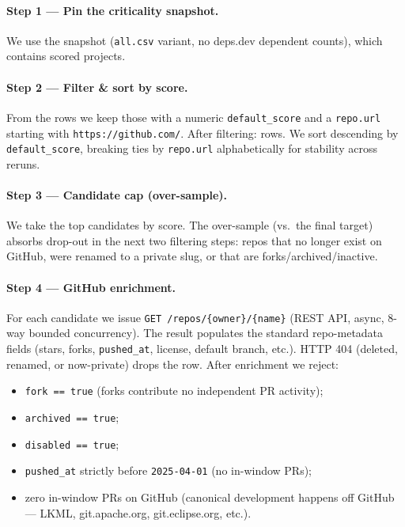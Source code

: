 \paragraph{Step 1 --- Pin the criticality snapshot.} We use the
\PLACEHOLDERSNAPSHOT{} snapshot (\texttt{all.csv} variant, no deps.dev
dependent counts), which contains \PLACEHOLDERSNAPSHOTROWS{} scored
projects.

\paragraph{Step 2 --- Filter \& sort by score.} From the
\PLACEHOLDERSNAPSHOTROWS{} rows we keep those with a numeric
\texttt{default\_score} and a \texttt{repo.url} starting with
\texttt{https://github.com/}. After filtering: \PLACEHOLDERSCOREDROWS{}
rows. We sort descending by \texttt{default\_score}, breaking ties by
\texttt{repo.url} alphabetically for stability across reruns.

\paragraph{Step 3 --- Candidate cap (over-sample).} We take the top
\PLACEHOLDERCANDCAP{} candidates by score. The over-sample (vs.\ the
final \PLACEHOLDERFINALCAP{} target) absorbs drop-out in the next two
filtering steps: repos that no longer exist on GitHub, were renamed to a
private slug, or that are forks/archived/inactive.

\paragraph{Step 4 --- GitHub enrichment.} For each candidate we issue
\texttt{GET /repos/\{owner\}/\{name\}} (REST API, async, 8-way bounded
concurrency). The result populates the standard repo-metadata fields
(stars, forks, \texttt{pushed\_at}, license, default branch, etc.). HTTP
404 (deleted, renamed, or now-private) drops the row. After enrichment we
reject:
\begin{itemize}
\item \texttt{fork == true} (forks contribute no independent PR activity);
\item \texttt{archived == true};
\item \texttt{disabled == true};
\item \texttt{pushed\_at} strictly before \texttt{2025-04-01} (no
in-window PRs);
\item zero in-window PRs on GitHub (canonical development happens off GitHub --- LKML, git.apache.org, git.eclipse.org, etc.).
\end{itemize}

